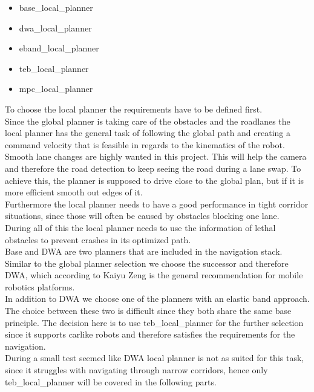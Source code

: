 \begin{itemize}
	\item base\_local\_planner
	\item dwa\_local\_planner
	\item eband\_local\_planner
	\item teb\_local\_planner
	\item mpc\_local\_planner
\end{itemize}\cite{navcore}

To choose the local planner the requirements have to be defined first.\\

Since the global planner is taking care of the obstacles and the roadlanes the local planner has the general task of following the global path and creating a command velocity that is feasible in regards to the kinematics of the robot.\\

Smooth lane changes are highly wanted in this project. This will help the camera and therefore the road detection to keep seeing the road during a lane swap. To achieve this, the planner is supposed to drive close to the global plan, but if it is more efficient smooth out edges of it.\\
Furthermore the local planner needs to have a good performance in tight corridor situations, since those will often be caused by obstacles blocking one lane.\\

During all of this the local planner needs to use the information of lethal obstacles to prevent crashes in its optimized path.\\


Base and DWA are two planners that are included in the navigation stack. Similar to the global planner selection we choose the successor and therefore DWA, which according to Kaiyu Zeng is the general recommendation for mobile robotics platforms\cite{navtuningguide}.\\


In addition to DWA we choose one of the planners with an elastic band approach. The choice between these two is difficult since they both share the same base principle. The decision here is to use teb\_local\_planner for the further selection since it supports carlike robots and therefore satisfies the requirements for the navigation.\\

During a small test seemed like DWA local planner is not as suited for this task, since it struggles with navigating through narrow corridors, hence only teb\_local\_planner will be covered in the following parts.

